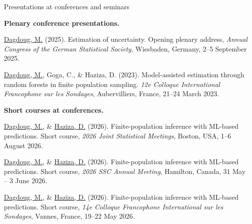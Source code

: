 \documentclass{resume}
\begin{document}
\begin{rSection}{Presentations at conferences and seminars}
\vspace{2mm}

\textbf{Plenary conference presentations.}
\begin{etaremune}
  \item \underline{Dagdoug, M.} (2025). Estimation of uncertainty. Opening plenary address, \textit{Annual Congress of the German Statistical Society}, Wiesbaden, Germany, 2--5 September 2025.
  \item \underline{Dagdoug, M.}, Goga, C., \& Haziza, D. (2023). Model-assisted estimation through random forests in finite population sampling. \textit{12e Colloque International Francophone sur les Sondages}, Aubervilliers, France, 21--24 March 2023.
\end{etaremune}

\vspace{1mm}\hrulefill\vspace{1mm}

\textbf{Short courses at conferences.}
\begin{etaremune}
  \item \underline{Dagdoug, M.}, \& \underline{Haziza, D.} (2026). Finite-population inference with ML-based predictions. Short course, \textit{2026 Joint Statistical Meetings}, Boston, USA, 1--6 August 2026.
  \item \underline{Dagdoug, M.}, \& \underline{Haziza, D.} (2026). Finite-population inference with ML-based predictions. Short course, \textit{2026 SSC Annual Meeting}, Hamilton, Canada, 31 May -- 3 June 2026.
  \item \underline{Dagdoug, M.}, \& \underline{Haziza, D.} (2026). Finite-population inference with ML-based predictions. Short course, \textit{14e Colloque Francophone International sur les Sondages}, Vannes, France, 19--22 May 2026.
\end{etaremune}

\vspace{1mm}\hrulefill\vspace{1mm}


\end{rSection}
\end{document}
